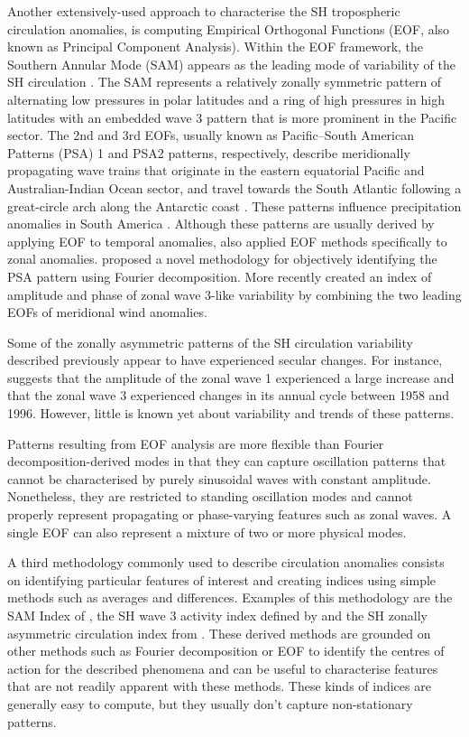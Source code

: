 \documentclass[pdflatex,sn-basic]{sn-jnl}
\theoremstyle{thmstyleone}%
\theoremstyle{thmstyletwo}%
\theoremstyle{thmstylethree}%
\begin{document}
Another extensively-used approach to characterise the SH tropospheric circulation anomalies, is computing Empirical Orthogonal Functions (EOF, also known as Principal Component Analysis).
Within the EOF framework, the Southern Annular Mode (SAM) appears as the leading mode of variability of the SH circulation \citep{fogt2020}.
The SAM represents a relatively zonally symmetric pattern of alternating low pressures in polar latitudes and a ring of high pressures in high latitudes with an embedded wave 3 pattern that is more prominent in the Pacific sector.
The 2nd and 3rd EOFs, usually known as Pacific--South American Patterns (PSA) 1 and PSA2 patterns, respectively, describe meridionally propagating wave trains that originate in the eastern equatorial Pacific and Australian-Indian Ocean sector, and travel towards the South Atlantic following a great-circle arch along the Antarctic coast \citep{mo2001}.
These patterns influence precipitation anomalies in South America \citep{mo2001}.
Although these patterns are usually derived by applying EOF to temporal anomalies, \citet{raphael2003} also applied EOF methods specifically to zonal anomalies.
\citet{irving2016} proposed a novel methodology for objectively identifying the PSA pattern using Fourier decomposition.
More recently \citet{goyal2022} created an index of amplitude and phase of zonal wave 3-like variability by combining the two leading EOFs of meridional wind anomalies.

Some of the zonally asymmetric patterns of the SH circulation variability described previously appear to have experienced secular changes.
For instance, \citet{raphael2003} suggests that the amplitude of the zonal wave 1 experienced a large increase and that the zonal wave 3 experienced changes in its annual cycle between 1958 and 1996.
However, little is known yet about variability and trends of these patterns.

Patterns resulting from EOF analysis are more flexible than Fourier decomposition-derived modes in that they can capture oscillation patterns that cannot be characterised by purely sinusoidal waves with constant amplitude.
Nonetheless, they are restricted to standing oscillation modes and cannot properly represent propagating or phase-varying features such as zonal waves.
A single EOF can also represent a mixture of two or more physical modes.

A third methodology commonly used to describe circulation anomalies consists on identifying particular features of interest and creating indices using simple methods such as averages and differences.
Examples of this methodology are the SAM Index of \citet{gong1999}, the SH wave 3 activity index defined by \citet{raphael2004} and the SH zonally asymmetric circulation index from \citet{hobbs2010}.
These derived methods are grounded on other methods such as Fourier decomposition or EOF to identify the centres of action for the described phenomena and can be useful to characterise features that are not readily apparent with these methods.
These kinds of indices are generally easy to compute, but they usually don't capture non-stationary patterns.
\end{document}
